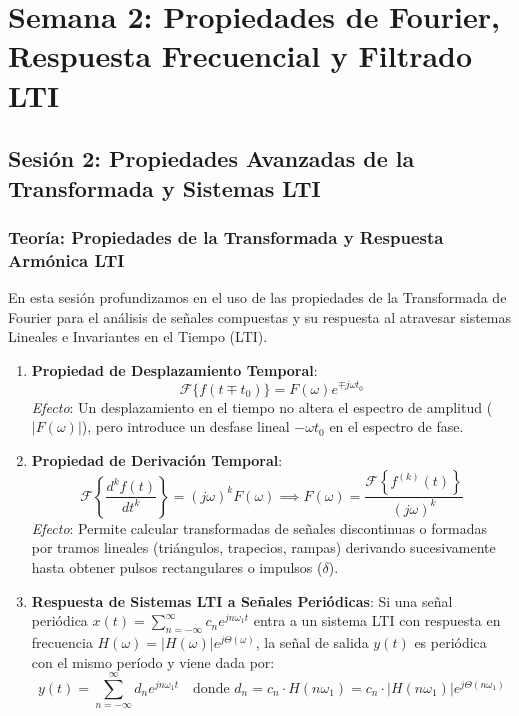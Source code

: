 \chapter{Semana 2: Propiedades de Fourier, Respuesta Frecuencial y Filtrado LTI}

\section{Sesión 2: Propiedades Avanzadas de la Transformada y Sistemas LTI}

\subsection{Teoría: Propiedades de la Transformada y Respuesta Armónica LTI}

\begin{tcolorbox}[cajaResumen, title={Fundamentos Teóricos: Sesión 2}]
En esta sesión profundizamos en el uso de las propiedades de la Transformada de Fourier para el análisis de señales compuestas y su respuesta al atravesar sistemas Lineales e Invariantes en el Tiempo (LTI).

\begin{enumerate}[leftmargin=*]
    \item \textbf{Propiedad de Desplazamiento Temporal}:
    \[
    \mathcal{F}\{f(t \mp t_0)\} = F(\omega) e^{\mp j\omega t_0}
    \]
    \textit{Efecto}: Un desplazamiento en el tiempo no altera el espectro de amplitud ($|F(\omega)|$), pero introduce un desfase lineal $-\omega t_0$ en el espectro de fase.

    \item \textbf{Propiedad de Derivación Temporal}:
    \[
    \mathcal{F}\left\{\frac{d^k f(t)}{dt^k}\right\} = (j\omega)^k F(\omega) \implies F(\omega) = \frac{\mathcal{F}\left\{f^{(k)}(t)\right\}}{(j\omega)^k}
    \]
    \textit{Efecto}: Permite calcular transformadas de señales discontinuas o formadas por tramos lineales (triángulos, trapecios, rampas) derivando sucesivamente hasta obtener pulsos rectangulares o impulsos ($\delta$).

    \item \textbf{Respuesta de Sistemas LTI a Señales Periódicas}:
    Si una señal periódica $x(t) = \sum_{n=-\infty}^{\infty} c_n e^{j n \omega_1 t}$ entra a un sistema LTI con respuesta en frecuencia $H(\omega) = |H(\omega)| e^{j \Theta(\omega)}$, la señal de salida $y(t)$ es periódica con el mismo período y viene dada por:
    \[
    y(t) = \sum_{n=-\infty}^{\infty} d_n e^{j n \omega_1 t} \quad \text{donde } d_n = c_n \cdot H(n\omega_1) = c_n \cdot |H(n\omega_1)| e^{j \Theta(n\omega_1)}
    \]
\end{enumerate}
\end{tcolorbox}

